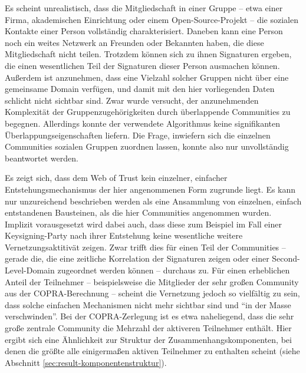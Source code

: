 Es scheint unrealistisch, dass die Mitgliedschaft in einer Gruppe --
etwa einer Firma, akademischen Einrichtung oder einem
Open-Source-Projekt -- die sozialen Kontakte einer Person
vollständig charakterisiert. Daneben kann eine Person noch ein
weites Netzwerk an Freunden oder Bekannten haben, die diese
Mitgliedschaft nicht teilen. Trotzdem können sich zu ihnen
Signaturen ergeben, die einen wesentlichen Teil der Signaturen dieser
Person ausmachen können. Außerdem ist anzunehmen, dass eine
Vielzahl solcher Gruppen nicht über eine gemeinsame Domain
verfügen, und damit mit den hier vorliegenden Daten schlicht nicht
sichtbar sind. Zwar wurde versucht, der anzunehmenden Komplexität
der Gruppenzugehörigkeiten durch überlappende Communities zu
begegnen. Allerdings konnte der verwendete Algorithmus keine
signifikanten Überlappungseigenschaften liefern. Die Frage,
inwiefern sich die einzelnen Communities sozialen Gruppen zuordnen
lassen, konnte also nur unvollständig beantwortet werden.

Es zeigt sich, dass dem Web of Trust kein einzelner, einfacher
Entstehungsmechanismus der hier angenommenen Form zugrunde liegt. Es
kann nur unzureichend beschrieben werden als eine Ansammlung von
einzelnen, einfach entstandenen Bausteinen, als die hier Communities
angenommen wurden. Implizit vorausgesetzt wird dabei auch, dass diese
zum Beispiel im Fall einer Keysigning-Party nach ihrer Entstehung
keine wesentliche weitere Vernetzungsaktitivät zeigen. Zwar trifft
dies für einen Teil der Communities -- gerade die, die eine
zeitliche Korrelation der Signaturen zeigen oder einer
Second-Level-Domain zugeordnet werden können -- durchaus zu. Für
einen erheblichen Anteil der Teilnehmer -- beispielsweise die
Mitglieder der sehr großen Community aus der COPRA-Berechnung --
scheint die Vernetzung jedoch so vielfältig zu sein, dass solche
einfachen Mechanismen nicht mehr sichtbar sind und ``in der Masse
verschwinden''. Bei der COPRA-Zerlegung ist es etwa naheliegend, dass
die sehr große zentrale Community die Mehrzahl der aktiveren
Teilnehmer enthält. Hier ergibt sich eine Ähnlichkeit zur Struktur
der Zusammenhangskomponenten, bei denen die größte alle 
einigermaßen aktiven Teilnehmer zu enthalten scheint (siehe Abschnitt
\ref{sec:result-komponentenstruktur}).

